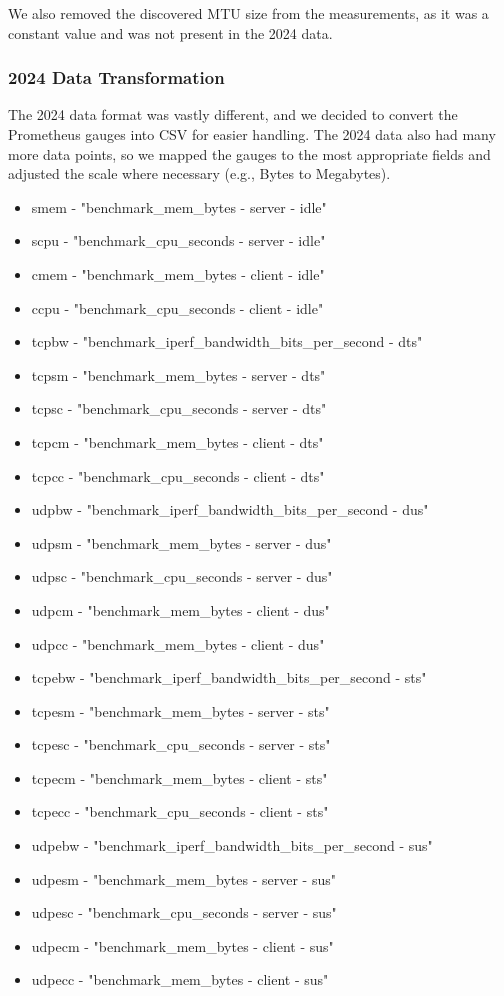 We also removed the discovered MTU size from the measurements, as it was a constant value and was not present in the 2024 data.

\subsubsection{2024 Data Transformation}

The 2024 data format was vastly different, and we decided to convert the Prometheus gauges into CSV for easier handling. The 2024 data also had many more data points, so we mapped the gauges to the most appropriate fields and adjusted the scale where necessary (e.g., Bytes to Megabytes).

\begin{itemize}
    \item smem - "benchmark\_mem\_bytes - server - idle"
    \item scpu - "benchmark\_cpu\_seconds - server - idle"
    \item cmem - "benchmark\_mem\_bytes - client - idle"
    \item ccpu - "benchmark\_cpu\_seconds - client - idle"
    \item tcpbw - "benchmark\_iperf\_bandwidth\_bits\_per\_second - dts"
    \item tcpsm - "benchmark\_mem\_bytes - server - dts"
    \item tcpsc - "benchmark\_cpu\_seconds - server - dts"
    \item tcpcm - "benchmark\_mem\_bytes - client - dts"
    \item tcpcc - "benchmark\_cpu\_seconds - client - dts"
    \item udpbw - "benchmark\_iperf\_bandwidth\_bits\_per\_second - dus"
    \item udpsm - "benchmark\_mem\_bytes - server - dus"
    \item udpsc - "benchmark\_cpu\_seconds - server - dus"
    \item udpcm - "benchmark\_mem\_bytes - client - dus"
    \item udpcc - "benchmark\_mem\_bytes - client - dus"
    \item tcpebw - "benchmark\_iperf\_bandwidth\_bits\_per\_second - sts"
    \item tcpesm - "benchmark\_mem\_bytes - server - sts"
    \item tcpesc - "benchmark\_cpu\_seconds - server - sts"
    \item tcpecm - "benchmark\_mem\_bytes - client - sts"
    \item tcpecc - "benchmark\_cpu\_seconds - client - sts"
    \item udpebw - "benchmark\_iperf\_bandwidth\_bits\_per\_second - sus"
    \item udpesm - "benchmark\_mem\_bytes - server - sus"
    \item udpesc - "benchmark\_cpu\_seconds - server - sus"
    \item udpecm - "benchmark\_mem\_bytes - client - sus"
    \item udpecc - "benchmark\_mem\_bytes - client - sus"
\end{itemize}

